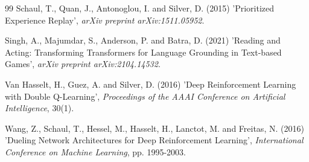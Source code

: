 \documentclass[11pt,a4paper]{article}
\begin{document}
\begin{thebibliography}{99}
 Schaul, T., Quan, J., Antonoglou, I. and Silver, D. (2015) 'Prioritized Experience Replay', \textit{arXiv preprint arXiv:1511.05952}.

 Singh, A., Majumdar, S., Anderson, P. and Batra, D. (2021) 'Reading and Acting: Transforming Transformers for Language Grounding in Text-based Games', \textit{arXiv preprint arXiv:2104.14532}.

 Van Hasselt, H., Guez, A. and Silver, D. (2016) 'Deep Reinforcement Learning with Double Q-Learning', \textit{Proceedings of the AAAI Conference on Artificial Intelligence}, 30(1).

 Wang, Z., Schaul, T., Hessel, M., Hasselt, H., Lanctot, M. and Freitas, N. (2016) 'Dueling Network Architectures for Deep Reinforcement Learning', \textit{International Conference on Machine Learning}, pp. 1995-2003.
\end{thebibliography}
\end{document}
